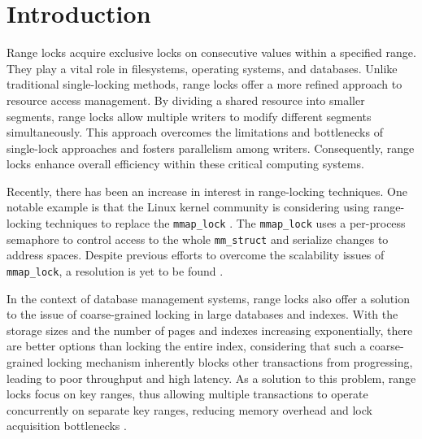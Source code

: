 
\chapter{Introduction}\label{chapter:introduction}

Range locks acquire exclusive locks on consecutive values within a specified range. They play a vital role in filesystems\parencite{lee2021concurrent}, operating systems\parencite{readerWriterLocks2017}, and databases\parencite{graefe2007hierarchical}. Unlike traditional single-locking methods, range locks offer a more refined approach to resource access management. By dividing a shared resource into smaller segments, range locks allow multiple writers to modify different segments simultaneously. This approach overcomes the limitations and bottlenecks of single-lock approaches and fosters parallelism among writers. Consequently, range locks enhance overall efficiency within these critical computing systems.

Recently, there has been an increase in interest in range-locking techniques. One notable example is that the Linux kernel community is considering using range-locking techniques to replace the \texttt{mmap\_lock} \parencite{readerWriterLocks2017, mapleTree2021, mmapLock2022}. The \texttt{mmap\_lock} uses a per-process semaphore to control access to the whole \texttt{mm\_struct} \parencite{mmstruct2023} and serialize changes to address spaces.  Despite previous efforts to overcome the scalability issues of \texttt{mmap\_lock}, a resolution is yet to be found \parencite{mmapLock2022}.

In the context of database management systems, range locks also offer a solution to the issue of coarse-grained locking in large databases and indexes. With the storage sizes and the number of pages and indexes increasing exponentially, there are better options than locking the entire index, considering that such a coarse-grained locking mechanism inherently blocks other transactions from progressing, leading to poor throughput and high latency. As a solution to this problem, range locks focus on key ranges, thus allowing multiple transactions to operate concurrently on separate key ranges, reducing memory overhead and lock acquisition bottlenecks \parencite{graefe2007hierarchical}.